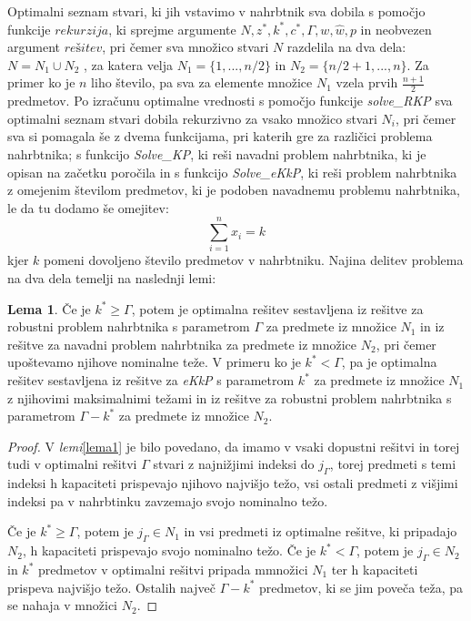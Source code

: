 \documentclass[a4paper,12pt]{article}
\theoremstyle{definition}
\newtheorem{definition}{Lema}
\begin{document}
Optimalni seznam stvari, ki jih vstavimo v nahrbtnik sva dobila s pomočjo funkcije $rekurzija$,
ki sprejme argumente $N, z^*, k^*, c^*,  \Gamma, w, \hat{w}, p$ in neobvezen argument 
$rešitev$,  pri čemer sva množico stvari $N$ razdelila na dva dela: $N = N_1 \cup N_2$ , za 
katera velja $N_1 = \{1, ..., n / 2\} $ in $N_2 = \{n / 2 + 1, ..., n\}$. Za primer ko je $n$ 
liho število, pa sva za elemente množice $N_1$ vzela prvih $\frac{n +1}{2} $ predmetov. Po izračunu
optimalne vrednosti s pomočjo funkcije \textit{solve\_RKP} sva optimalni seznam stvari dobila rekurzivno za 
vsako množico stvari $N_i$, pri čemer sva si pomagala še z dvema funkcijama, pri katerih gre 
za različici problema nahrbtnika; s funkcijo \textit{Solve\_KP}, ki reši navadni problem
nahrbtnika, ki je opisan na začetku poročila in s funkcijo \textit{Solve\_eKkP}, ki reši 
problem nahrbtnika z omejenim številom predmetov, ki je podoben navadnemu problemu nahrbtnika, 
le da tu dodamo še omejitev:
\begin{equation}
\tag*{}   
\sum_{i=1}^{n}x_i = k
\end{equation} kjer $k$ pomeni dovoljeno število predmetov v nahrbtniku.
Najina delitev problema na dva dela temelji na naslednji lemi:
\begin{definition}
Če je $k^* \geq \Gamma$, potem je optimalna rešitev sestavljena iz rešitve za robustni problem 
nahrbtnika s parametrom $\Gamma$ za predmete iz množice $N_1$ in iz rešitve za navadni problem 
nahrbtnika za predmete iz množice $N_2$, pri čemer upoštevamo njihove nominalne teže. 
V primeru ko  je $k^* < \Gamma$, pa je optimalna rešitev sestavljena iz rešitve za
\textit{eKkP} s parametrom $k^*$ za predmete iz množice $N_1$ z njihovimi maksimalnimi 
težami in iz rešitve za robustni problem nahrbtnika s parametrom   $\Gamma - k^*$ za predmete 
iz množice $N_2$.
\end{definition}
\begin{proof}
    V \textit{lemi}\ref{lema1} je bilo povedano, da imamo v vsaki dopustni rešitvi
    in torej tudi v optimalni rešitvi $\Gamma$ stvari z najnižjimi
    indeksi do $j_\Gamma$, torej predmeti s temi indeksi h kapaciteti prispevajo
    njihovo najvišjo težo, vsi ostali predmeti z višjimi indeksi
    pa v nahrbtinku zavzemajo svojo nominalno težo. 
    \par
    Če je $k^* \geq \Gamma$, potem je $j_\Gamma \in N_1$ in vsi predmeti
    iz optimalne rešitve, ki pripadajo $N_2$, h kapaciteti prispevajo
    svojo nominalno težo.
    Če je $k^* < \Gamma$, potem je $j_\Gamma \in N_2$ in $k^*$
    predmetov v optimalni rešitvi pripada mmnožici $N_1$ 
    ter h kapaciteti prispeva najvišjo težo. Ostalih največ
    $\Gamma - k^*$ predmetov, ki se jim poveča teža, pa se nahaja
    v množici $N_2$.
\end{proof}
\end{document}
